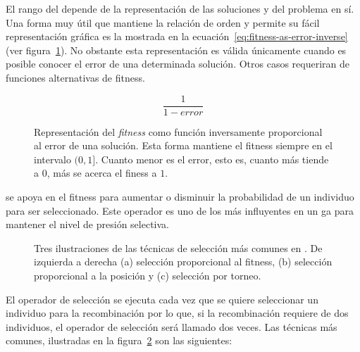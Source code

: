 El rango del  depende de la representación de las soluciones y del problema en sí. Una forma muy útil que mantiene la relación de orden y permite su fácil representación gráfica es la mostrada en la ecuación~\ref{eq:fitness-as-error-inverse} (ver figura~\ref{fig:fitness-via-error}). No obstante esta representación es válida únicamente cuando es posible conocer el error de una determinada solución. Otros casos requeriran de funciones alternativas de fitness.

\begin{equation}
	\frac{1}{1 - error}
	\label{eq:fitness-as-error-inverse}
\end{equation}

\begin{figure}
	\caption[Representación del \textit{fitness} como función inversamente proporcional al error]{Representación del \textit{fitness} como función inversamente proporcional al error de una solución. Esta forma mantiene el fitness siempre en el intervalo $(0, 1]$. Cuanto menor es el error, esto es, cuanto más tiende a $0$, más se acerca el finess a $1$.}
	\label{fig:fitness-via-error}
\end{figure}


 se apoya en el fitness para aumentar o disminuir la probabilidad de un individuo para ser seleccionado. Este operador es uno de los más influyentes en un \gls{ga} para mantener el nivel de presión selectiva.

\begin{figure}
	\caption[Técnicas de selección más comunes en ]{Tres ilustraciones de las técnicas de selección más comunes en . De izquierda a derecha (a) selección proporcional al fitness, (b) selección proporcional a la posición y (c) selección por torneo.}
	\label{fig:selection-techniques}
\end{figure}

El operador de selección se ejecuta cada vez que se quiere seleccionar un individuo para la recombinación por lo que, si la recombinación requiere de dos individuos, el operador de selección será llamado dos veces. Las técnicas más comunes, ilustradas en la figura~\ref{fig:selection-techniques} son las siguientes:

